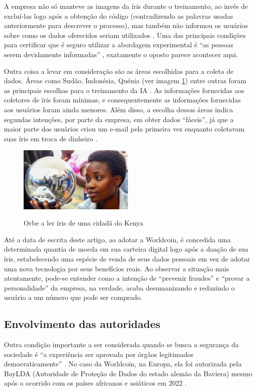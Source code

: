 \documentclass[referee,sn-basic]{sn-jnl}
\theoremstyle{thmstyleone}%
\begin{document}
A empresa não só manteve as imagens da íris durante o treinamento, ao invés de excluí-las logo após a obtenção do código (contradizendo as palavras usadas anteriormente para descrever o processo), mas também não informou os usuários sobre como os dados oferecidos seriam utilizados \cite{GuoWorldcoin2022}. Uma das principais condições para certificar que é seguro utilizar a abordagem experimental é “as pessoas serem devidamente informadas” \cite{brey2017ethics}, exatamente o oposto parece acontecer aqui.\par

Outra coisa a levar em consideração são as áreas escolhidas para a coleta de dados. Áreas como Sudão, Indonésia, Quénia (ver imagem \ref{fig:kenya}) entre outras foram as principais escolhas para o treinamento da IA \cite{GuoWorldcoin2022}. As informações fornecidas aos coletores de íris foram mínimas, e consequentemente as informações fornecidas aos usuários foram ainda menores. Além disso, a escolha dessas áreas indica segundas intenções, por parte da empresa, em obter dados “fáceis”, já que a maior parte dos usuários criou um e-mail pela primeira vez enquanto coletavam suas íris em troca de dinheiro \cite{GuoWorldcoin2022}.\par

\begin{figure}
    \centering
    \includegraphics[width=0.5\textwidth]{kenya.jpg}
    \label{fig:kenya}
    \caption{Orbe a ler íris de uma cidadã do Kenya}
\end{figure}

Até a data de escrita deste artigo, ao adotar a Worldcoin, é concedida uma determinada quantia de moeda em sua carteira digital logo após a doação de sua íris, estabelecendo uma espécie de venda de seus dados pessoais em vez de adotar uma nova tecnologia por seus benefícios reais. Ao observar a situação mais atentamente, pode-se entender como a intenção de “prevenir fraudes” e “provar a personalidade” da empresa, na verdade, acaba desumanizando e reduzindo o usuário a um número que pode ser comprado.


\subsection{Envolvimento das autoridades}
\hspace{0.7cm}Outra condição importante a ser considerada quando se busca a segurança da sociedade é “a experiência ser aprovada por órgãos legitimados democraticamente” \cite{brey2017ethics}. No caso da Worldcoin, na Europa, ela foi autorizada pela BayLDA (Autoridade de Proteção de Dados do estado alemão da Baviera) mesmo após o ocorrido com os países africanos e asiáticos em 2022 \cite{Lomasworldcoin2023}.\par 
\end{document}
